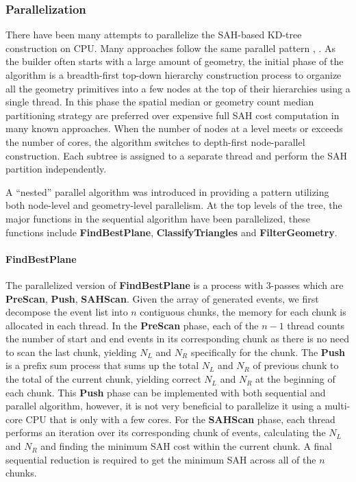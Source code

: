 
\subsubsection{Parallelization}
\label{subsubsec:parallelization}


There have been many attempts to parallelize the SAH-based KD-tree construction on CPU. Many approaches follow the same parallel pattern \cite{msk2007}, \cite{p2006}. As the builder often starts with a large amount of geometry, the initial phase of the algorithm is a breadth-first top-down hierarchy construction process to organize all the geometry primitives into a few nodes at the top of their hierarchies using a single thread. In this phase the spatial median \cite{zhou2008} or geometry count median \cite{msk2007} partitioning strategy are preferred over expensive full SAH cost computation in many known approaches. When the number of nodes at a level meets or exceeds the number of cores, the algorithm switches to depth-first node-parallel construction. Each subtree is assigned to a separate thread and perform the SAH partition independently. 

A ``nested'' parallel algorithm was introduced in \cite{c2010} providing a pattern utilizing both node-level and geometry-level parallelism. At the top levels of the tree, the major functions in the sequential algorithm have been parallelized, these functions include \textbf{FindBestPlane}, \textbf{ClassifyTriangles} and \textbf{FilterGeometry}. 

\paragraph{FindBestPlane} 
The parallelized version of \textbf{FindBestPlane} is a process with 3-passes which are \textbf{PreScan}, \textbf{Push}, \textbf{SAHScan}. Given the array of generated events, we first decompose the event list into \(n\) contiguous chunks, the memory for each chunk is allocated in each thread. In the \textbf{PreScan} phase, each of the \(n - 1\) thread counts the number of start and end events in its corresponding chunk as there is no need to scan the last chunk, yielding \(N_{L}\) and \(N_{R}\) specifically for the chunk. The \textbf{Push} is a prefix sum process that sums up the total \(N_{L}\) and \(N_{R}\) of previous chunk to the total of the current chunk, yielding correct \(N_{L}\) and \(N_{R}\) at the beginning of each chunk. This \textbf{Push} phase can be implemented with both sequential and parallel algorithm, however, it is not very beneficial to parallelize it using a multi-core CPU that is only with a few cores. For the \textbf{SAHScan} phase, each thread performs an iteration over its corresponding chunk of events, calculating the \(N_{L}\) and \(N_{R}\) and finding the minimum SAH cost within the current chunk. A final sequential reduction is required to get the minimum SAH across all of the \(n\) chunks. 

